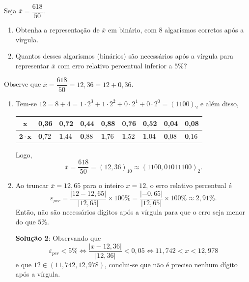 \documentclass[12pt,a4paper]{article}
\begin{document}
\begin{ExerciseList}
\Exercise[title={2,5}]
Seja $\overline{x} = \dfrac{618}{50}$.
\begin{enumerate}
\item Obtenha a representação de $\overline{x}$ em binário, com 8 algarismos corretos após a vírgula.
\item Quantos desses algarismos (binários) são necessários após a vírgula para representar $\overline{x}$ com erro relativo percentual inferior a $5\%$?
\end{enumerate}
\Answer Observe que $\overline{x} = \dfrac{618}{50} = 12,36 = 12 + 0,36$.
\begin{enumerate}
\item Tem-se $12 = 8 + 4 = 1 \cdot 2^3 + 1 \cdot 2^2 +0 \cdot 2^1 + 0 \cdot 2^0 = (1100)_{2}$ e além disso,
\begin{center}
\begin{tabular}{|c|l|l|l|l|l|l|l|l|}
\hline
$\mathbf{x}$       
& 0,36 & 0,72 & 0,44 & 0,88 & 0,76 & 0,52 & 0,04 & 0,08 \\ \hline
$\mathbf{2\cdot x}$
& \textbf{0},72
& \textbf{1},44
& \textbf{0},88
& \textbf{1},76
& \textbf{1},52
& \textbf{1},04
& \textbf{0},08
& \textbf{0},16
\\ \hline
\end{tabular}
\end{center}
Logo,
\[
\overline{x}
= \dfrac{618}{50}
= (12,36)_{10}
\approx (1100,01011100)_2.
\]
\item Ao truncar $\overline{x} = 12,65$ para o inteiro $x = 12$, o erro relativo percentual é
\[
\varepsilon_{per} = \frac{|12 - 12,65|}{|12,65|} \times 100\%
                  = \frac{|-0,65|}{|12,65|} \times 100\%
                  \approx 2,91\%.
\]
Então, não são necessários dígitos após a vírgula para que o erro seja menor do que $5\%$.

\textbf{Solução 2}: Observando que
\[
\varepsilon_{per} < 5\%
\Leftrightarrow
\frac{|x-12,36|}{|12,36|} < 0,05
\Leftrightarrow
11,742< x <12,978
\]
e que $12 \in (11,742, 12,978)$, conclui-se que não é preciso nenhum dígito após a vírgula.
\end{enumerate}


\end{ExerciseList}
\end{document}
